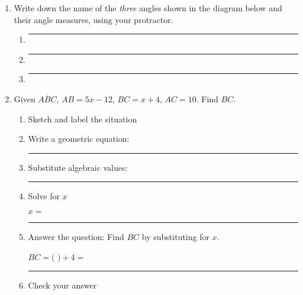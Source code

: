\documentclass[12pt, oneside]{article}
\begin{document}
\begin{enumerate}
  \item Write down the name of the \emph{three} angles shown in the diagram below and their angle measures, using your protractor. \vspace{1cm}
    \begin{center}
    \end{center}
    \begin{enumerate}
      \item  \rule{4cm}{0.15mm} \bigskip
      \item  \rule{4cm}{0.15mm} \bigskip
      \item  \rule{4cm}{0.15mm} \bigskip
    \end{enumerate}

\newpage
    \item Given $\overline{ABC}$, $AB=5x-12$, $BC=x+4$, $AC=10$. Find ${BC}$.
    \begin{enumerate}
      \item Sketch and label the situation
      \begin{flushright}
      \end{flushright} \vspace{1cm}
      \item Write a geometric equation: \rule{5cm}{0.15mm} \vspace{1cm}
      \item Substitute algebraic values: \rule{5cm}{0.15mm}
      \item Solve for $x$
      \vspace{3cm}
      \begin{center} $x=$ \rule{1cm}{0.15mm} \end{center}
      \item Answer the question: Find $BC$ by substituting for $x$.\\
      \begin{center} $BC=($ \hspace{1cm} $)+4=$ \rule{1cm}{0.15mm} \end{center}
      \item Check your answer
    \end{enumerate}
    \vspace{2cm}


\end{enumerate}
\end{document}
